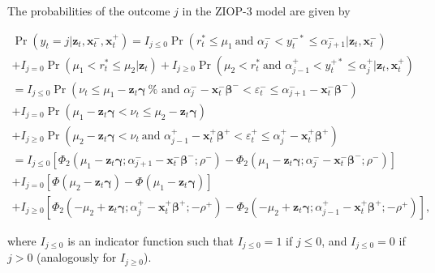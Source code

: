 \documentclass[letterpaper,fleqn,12pt]{article}
\begin{document}
\begin{onehalfspace}
\bigskip 

The probabilities of the outcome $j$ in the ZIOP-3 model are given by

\begin{flushleft}
\begin{equation}
\begin{array}{l}
\Pr (y_{t}=j|\mathbf{z}_{t},\mathbf{x}_{t}^{-},\mathbf{x}_{t}^{+})=I_{j\leq
0}\Pr (r_{t}^{\ast }\leq \mu _{1}\ \text{and }\alpha _{j}^{-}<y_{t}^{-\ast
}\leq \alpha _{j+1}^{-}|\mathbf{z}_{t},\mathbf{x}_{t}^{-}) \\ 
+I_{j=0}\Pr (\mu _{1}<r_{t}^{\ast }\leq \mu _{2}|\mathbf{z}_{t})+I_{j\geq
0}\Pr (\mu _{2}<r_{t}^{\ast }\ \text{and }\alpha _{j-1}^{+}<y_{t}^{+\ast
}\leq \alpha _{j}^{+}|\mathbf{z}_{t},\mathbf{x}_{t}^{+}) \\ 
=I_{j\leq 0}\Pr (\nu _{t}\leq \mu _{1}-\mathbf{z}_{t}\mathbf{\gamma }\ \text{%
and }\alpha _{j}^{-}-\mathbf{x}_{t}^{-}\mathbf{\beta }^{-}<\varepsilon
_{t}^{-}\leq \alpha _{j+1}^{-}-\mathbf{x}_{t}^{-}\mathbf{\beta }^{-}) \\ 
+I_{j=0}\Pr (\mu _{1}-\mathbf{z}_{t}\mathbf{\gamma }<\nu _{t}\leq \mu _{2}-%
\mathbf{z}_{t}\mathbf{\gamma }) \\ 
+I_{j\geq 0}\Pr (\mu _{2}-\mathbf{z}_{t}\mathbf{\gamma }<\nu _{t}\ \text{and 
}\alpha _{j-1}^{+}-\mathbf{x}_{t}^{+}\mathbf{\beta }^{+}<\varepsilon
_{t}^{+}\leq \alpha _{j}^{+}-\mathbf{x}_{t}^{+}\mathbf{\beta }^{+}) \\ 
=I_{j\leq 0}[\Phi _{2}(\mu _{1}-\mathbf{z}_{t}\mathbf{\gamma };\alpha
_{j+1}^{-}-\mathbf{x}_{t}^{-}\mathbf{\beta }^{-}\mathbf{;}\rho ^{-})-\Phi
_{2}(\mu _{1}-\mathbf{z}_{t}\mathbf{\gamma };\alpha _{j}^{-}-\mathbf{x}%
_{t}^{-}\mathbf{\beta }^{-}\mathbf{;}\rho ^{-})] \\ 
+I_{j=0}[\Phi (\mu _{2}-\mathbf{z}_{t}\mathbf{\gamma })-\Phi (\mu _{1}-%
\mathbf{z}_{t}\mathbf{\gamma })] \\ 
+I_{j\geq 0}[\Phi _{2}(-\mu _{2}+\mathbf{z}_{t}\mathbf{\gamma };\alpha
_{j}^{+}-\mathbf{x}_{t}^{+}\mathbf{\beta }^{+};\mathbf{-}\rho ^{+})-\Phi
_{2}(-\mu _{2}+\mathbf{z}_{t}\mathbf{\gamma };\alpha _{j-1}^{+}-\mathbf{x}%
_{t}^{+}\mathbf{\beta }^{+};\mathbf{-}\rho ^{+})]\text{,}%
\end{array}
\label{Prob CroNOP}
\end{equation}
\end{flushleft}

\noindent where $I_{j\leq 0}$ is an indicator function such that $I_{j\leq
0}=1$ if $j\leq 0$, and $I_{j\leq 0}=0$ if $j>0$ (analogously for $I_{j\geq
0}$).


\end{onehalfspace}
\end{document}
